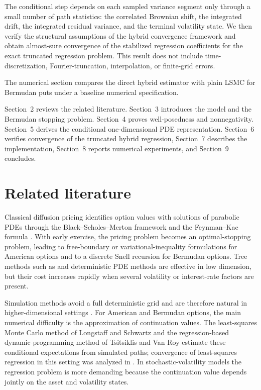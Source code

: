 \documentclass[pdflatex,sn-mathphys-num]{sn-jnl}
\theoremstyle{thmstyleone}%
\theoremstyle{thmstylethree}%
\theoremstyle{thmstyletwo}%
\begin{document}
The conditional step depends on each sampled variance segment only through a
small number of path statistics: the correlated Brownian shift, the integrated
drift, the integrated residual variance, and the terminal volatility state. We
then verify the structural assumptions of the hybrid convergence framework and
obtain almost-sure convergence of the stabilized regression coefficients for the
exact truncated regression problem. This result does not include
time-discretization, Fourier-truncation, interpolation, or finite-grid errors.

The numerical section compares the direct hybrid estimator with plain LSMC for
Bermudan puts under a baseline numerical specification.

Section~2 reviews the related literature. Section~3 introduces the model and the
Bermudan stopping problem. Section~4 proves well-posedness and nonnegativity.
Section~5 derives the conditional one-dimensional PDE representation. Section~6
verifies convergence of the truncated hybrid regression, Section~7 describes the
implementation, Section~8 reports numerical experiments, and Section~9 concludes.







\section{Related literature}

Classical diffusion pricing identifies option values with solutions of parabolic
PDEs through the Black--Scholes--Merton framework and the Feynman--Kac formula
\cite{black1973pricing,merton1973theory,karatzas1991brownian}. With early
exercise, the pricing problem becomes an optimal-stopping problem, leading to
free-boundary or variational-inequality formulations for American options
\cite{merton1977americanput,jaillet1990variational} and to a discrete Snell
recursion for Bermudan options. Tree methods such as \cite{cox1979option} and
deterministic PDE methods are effective in low dimension, but their cost
increases rapidly when several volatility or interest-rate factors are present.

Simulation methods avoid a full deterministic grid and are therefore natural in
higher-dimensional settings \cite{glasserman2004montecarlo}. For American and
Bermudan options, the main numerical difficulty is the approximation of
continuation values. The least-squares Monte Carlo method of Longstaff and
Schwartz \cite{longstaff2001valuing} and the regression-based dynamic-programming
method of Tsitsiklis and Van Roy \cite{tsitsiklis2001regression} estimate these
conditional expectations from simulated paths; convergence of least-squares
regression in this setting was analyzed in \cite{clement2002analysis}. In
stochastic-volatility models the regression problem is more demanding because the
continuation value depends jointly on the asset and volatility states.
\end{document}

